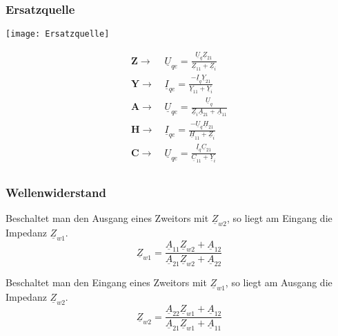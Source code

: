 \subsubsection{Ersatzquelle}
\centering\texttt{[image: Ersatzquelle]}
\begin{mdframed}[style=exercise]
    \begin{align*}
        \boldsymbol{Z}\rightarrow&\  \underline{U}_{qe} = \frac{\underline{U}_q\underline{Z}_{21}}{\underline{Z}_{11}+\underline{Z}_i}\\
        \boldsymbol{Y}\rightarrow&\  \underline{I}_{qe} = \frac{-\underline{I}_q\underline{Y}_{21}}{\underline{Y}_{11}+\underline{Y}_i}\\
        \boldsymbol{A}\rightarrow&\  \underline{U}_{qe} = \frac{\underline{U}_q}{\underline{Z}_i\underline{A}_{21}+\underline{A}_{11}}\\
        \boldsymbol{H}\rightarrow&\  \underline{I}_{qe} = \frac{-\underline{U}_q\underline{H}_{21}}{\underline{H}_{11}+\underline{Z}_i}\\
        \boldsymbol{C}\rightarrow&\  \underline{U}_{qe} = \frac{\underline{I}_q\underline{C}_{21}}{\underline{C}_{11}+\underline{Y}_i}\\
    \end{align*}
\end{mdframed}
\raggedright

\subsubsection{Wellenwiderstand}
Beschaltet man den Ausgang eines Zweitors mit $\underline{Z}_{w2}$, so liegt am
Eingang die Impedanz $\underline{Z}_{w1}$.
\[
    \underline{Z}_{w1} = \frac{\underline{A}_{11}\underline{Z}_{w2} + \underline{A}_{12}}{\underline{A}_{21}\underline{Z}_{w2}+\underline{A}_{22}}
\]

Beschaltet man den Eingang eines Zweitors mit $\underline{Z}_{w1}$, so liegt am
Ausgang die Impedanz $\underline{Z}_{w2}$.
\[
  \underline{Z}_{w2} = \frac{\underline{A}_{22}\underline{Z}_{w1} + \underline{A}_{12}}{\underline{A}_{21}\underline{Z}_{w1}+\underline{A}_{11}}
\]

